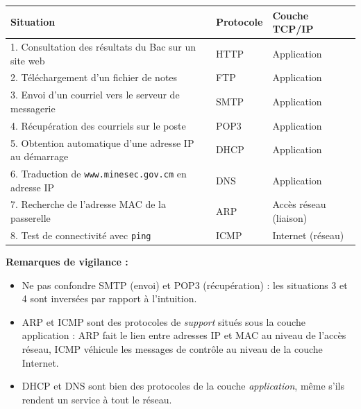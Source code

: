 \documentclass[11pt]{article}
\newcommand{\cle}[1]{{\popxbold\color{popdark}#1}}
\begin{document}
\begin{corrige}
\begin{center}
\begin{tabularx}{\linewidth}{|X|l|l|}
\hline
\rowcolor{popblueL} \textbf{Situation} & \textbf{Protocole} & \textbf{Couche TCP/IP} \\
\hline
1. Consultation des résultats du Bac sur un site web & \cle{HTTP} & Application \\
\hline
2. Téléchargement d'un fichier de notes & \cle{FTP} & Application \\
\hline
3. Envoi d'un courriel vers le serveur de messagerie & \cle{SMTP} & Application \\
\hline
4. Récupération des courriels sur le poste & \cle{POP3} & Application \\
\hline
5. Obtention automatique d'une adresse IP au démarrage & \cle{DHCP} & Application \\
\hline
6. Traduction de \texttt{www.minesec.gov.cm} en adresse IP & \cle{DNS} & Application \\
\hline
7. Recherche de l'adresse MAC de la passerelle & \cle{ARP} & Accès réseau (liaison) \\
\hline
8. Test de connectivité avec \texttt{ping} & \cle{ICMP} & Internet (réseau) \\
\hline
\end{tabularx}
\end{center}
\textbf{Remarques de vigilance :}
\begin{itemize}
\item Ne pas confondre \cle{SMTP} (envoi) et \cle{POP3} (récupération) : les situations 3 et 4 sont inversées par rapport à l'intuition.
\item \cle{ARP} et \cle{ICMP} sont des protocoles de \emph{support} situés sous la couche application : \cle{ARP} fait le lien entre adresses IP et MAC au niveau de l'accès réseau, \cle{ICMP} véhicule les messages de contrôle au niveau de la couche Internet.
\item \cle{DHCP} et \cle{DNS} sont bien des protocoles de la couche \emph{application}, même s'ils rendent un service à tout le réseau.
\end{itemize}
\end{corrige}
\end{document}
